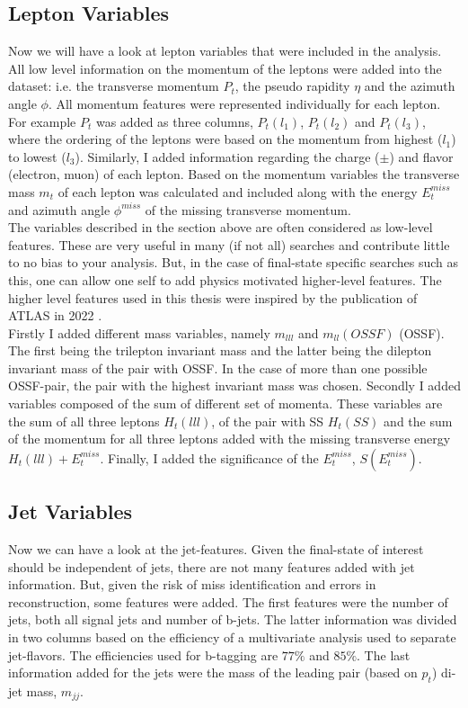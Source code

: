 \subsection{Lepton Variables}\label{subsec:LepSel}
Now we will have a look at lepton variables that were included in the analysis. All low level information on the
momentum of the leptons were added into the dataset: i.e. the transverse momentum $P_t$, the pseudo rapidity $\eta$ and the azimuth
angle $\phi$. All momentum features were represented individually for each lepton. For example $P_t$ was added as three columns, $P_t(l_1)$,
$P_t(l_2)$ and $P_t(l_3)$, where the ordering of the leptons were based on the momentum from highest ($l_1$) to lowest ($l_3$).
Similarly, I added information regarding the charge ($\pm$) and flavor (electron, muon) of each lepton. Based on the momentum variables
the transverse mass $m_t$ of each lepton was calculated and included along with the energy $E_t^{miss}$ and azimuth angle $\phi^{miss}$ 
of the missing transverse momentum.
\\
The variables described in the section above are often considered as low-level features. These are very useful in many (if not all)
searches and contribute little to no bias to your analysis. But, in the case of final-state specific searches such as this,
one can allow one self to add physics motivated higher-level features. The higher level features used in this thesis
were inspired by the publication of \ac{ATLAS} in 2022 \cite{franchini_search_2019}. 
\\
Firstly I added different mass variables, namely $m_{lll}$ and $m_{ll}(OSSF)$ (\ac{OSSF}). The first being the trilepton invariant mass 
and the latter being the dilepton invariant mass of the pair with \ac{OSSF}. In the case of more than one possible OSSF-pair,
the pair with the highest invariant mass was chosen. Secondly I added variables composed of the sum of different set of momenta.
These variables are the sum of all three leptons $H_t(lll)$, of the pair with \ac{SS} $H_t(SS)$ and the sum of the momentum
for all three leptons added with the missing transverse energy $H_t(lll) + E_t^{miss}$. Finally, I added the significance of the
$E_t^{miss}$, $S(E_t^{miss})$.
\subsection{Jet Variables}\label{subsec:JetSel}
Now we can have a look at the jet-features. Given the final-state of interest should be independent of jets, there are not many
features added with jet information. But, given the risk of miss identification and errors in reconstruction, some features were 
added. The first features were the number of jets, both all signal jets and number of b-jets.
The latter information was divided in two columns based on the efficiency of a multivariate analysis used to separate jet-flavors.
The efficiencies used for b-tagging are $77\%$ and $85\%$. The last information added for the jets were the mass of the leading pair 
(based on $p_t$) di-jet mass, $m_{jj}$.
